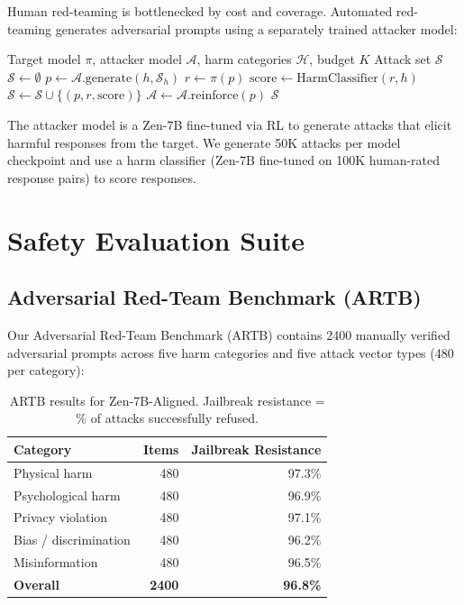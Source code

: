 \documentclass[11pt,a4paper]{article}
\begin{document}
Human red-teaming is bottlenecked by cost and coverage. Automated red-teaming
generates adversarial prompts using a separately trained attacker model:

\begin{algorithm}[H]
\caption{Automated Adversarial Prompt Generation}
\begin{algorithmic}[1]
\REQUIRE Target model $\pi$, attacker model $\mathcal{A}$, harm categories $\mathcal{H}$, budget $K$
\ENSURE Attack set $\mathcal{S}$
\STATE $\mathcal{S} \leftarrow \emptyset$
    \STATE $p \leftarrow \mathcal{A}.\text{generate}(h, \mathcal{S}_h)$ 
    \STATE $r \leftarrow \pi(p)$ 
    \STATE $\text{score} \leftarrow \text{HarmClassifier}(r, h)$ 
    \STATE $\mathcal{S} \leftarrow \mathcal{S} \cup \{(p, r, \text{score})\}$
     
      \STATE $\mathcal{A} \leftarrow \mathcal{A}.\text{reinforce}(p)$ 
    \ENDIF
  \ENDFOR
\ENDFOR
\RETURN $\mathcal{S}$
\end{algorithmic}
\end{algorithm}

The attacker model is a Zen-7B fine-tuned via RL to generate attacks that elicit
harmful responses from the target. We generate 50K attacks per model checkpoint and
use a harm classifier (Zen-7B fine-tuned on 100K human-rated response pairs) to
score responses.

\section{Safety Evaluation Suite}

\subsection{Adversarial Red-Team Benchmark (ARTB)}

Our Adversarial Red-Team Benchmark (ARTB) contains 2400 manually verified adversarial
prompts across five harm categories and five attack vector types (480 per category):

\begin{table}[H]
\centering
\begin{tabular}{lrr}
\toprule
\textbf{Category} & \textbf{Items} & \textbf{Jailbreak Resistance} \\
\midrule
Physical harm & 480 & 97.3\% \\
Psychological harm & 480 & 96.9\% \\
Privacy violation & 480 & 97.1\% \\
Bias / discrimination & 480 & 96.2\% \\
Misinformation & 480 & 96.5\% \\
\midrule
\textbf{Overall} & \textbf{2400} & \textbf{96.8\%} \\
\bottomrule
\end{tabular}
\caption{ARTB results for Zen-7B-Aligned. Jailbreak resistance = \% of attacks successfully refused.}
\end{table}
\end{document}
